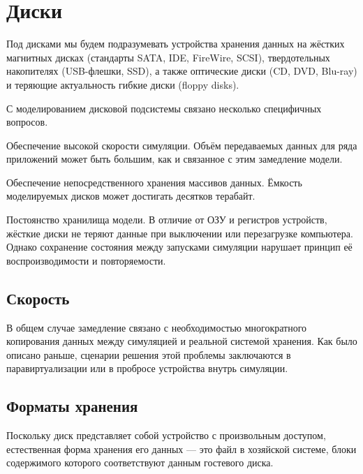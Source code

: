 \section{Диски}

Под дисками мы будем подразумевать устройства хранения данных на жёстких магнитных дисках (стандарты SATA, IDE, FireWire, SCSI), твердотельных накопителях (USB-флешки, SSD), а также оптические диски (CD, DVD, Blu-ray) и теряющие актуальность гибкие диски (\abbr floppy disks).

С моделированием дисковой подсистемы связано несколько специфичных вопросов.

\begin{itemize*}
\item Обеспечение высокой скорости симуляции. Объём передаваемых данных для ряда приложений может быть большим, как и связанное с этим замедление модели.

\item Обеспечение непосредственного хранения массивов данных. Ёмкость моделируемых дисков может достигать десятков терабайт.
\item Постоянство хранилища модели. В отличие от ОЗУ и регистров устройств, жёсткие диски не теряют данные при выключении или перезагрузке компьютера. Однако сохранение состояния между запусками симуляции нарушает принцип её воспроизводимости и повторяемости.
\end{itemize*}

\subsection{Скорость}

В общем случае замедление связано с необходимостью многократного копирования данных между симуляцией и реальной системой хранения. Как было описано раньше, сценарии решения этой проблемы заключаются в паравиртуализации или в пробросе устройства внутрь симуляции.

\subsection{Форматы хранения}

Поскольку диск представляет собой устройство с произвольным доступом, естественная форма хранения его данных — это файл в хозяйской системе, блоки содержимого которого соответствуют данным гостевого диска.

